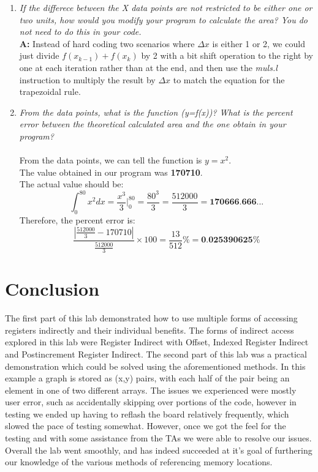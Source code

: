 \documentclass[letterpaper]{article}
\begin{document}
\begin{enumerate}
    \item \textit{If the differece between the X data points are not restricted to be either one
                  or two units, how would you modify your program to calculate the area? You do
                  not need to do this in your code.}\\
          \textbf{A: }
          Instead of hard coding two scenarios where $\Delta x$ is either 1 or 2,
          we could just divide $f(x_{k-1})+f(x_k)$ by 2 with a bit shift operation
          to the right by one at each iteration rather than at the end, and then use the \textit{muls.l} 
          instruction to multiply the result by $\Delta x$ to match the equation for the trapezoidal rule.
    \item \textit{From the data points, what is the function (y=f(x))? What is the percent error between the
                  theoretical calculated area and the one obtain in your program?}\\
          \\From the data points, we can tell the function is $y=x^2$.\\
          The value obtained in our program was \textbf{170710}.\\
          The actual value should be:\\
          $$\int_0^{80} x^2 dx = \frac{x^3}{3}\Big|_0^{80} = \frac{80^3}{3} = \frac{512000}{3}= \textbf{170666.666...} $$
          Therefore, the percent error is:
          $$\frac{|\frac{512000}{3}-170710|}{\frac{512000}{3}}\times 100 = \frac{13}{512}\% = \textbf{0.025390625\%}$$

  \end{enumerate}

\section{Conclusion}
The first part of this lab demonstrated how to use multiple forms of accessing 
registers indirectly and their individual benefits. The forms of indirect access 
explored in this lab were Register Indirect with Offset, Indexed Register 
Indirect and Postincrement Register Indirect. The second part of this lab was a
practical demonstration which could be solved using the aforementioned methods. 
In this example a graph is stored as (x,y) pairs, with each half of the pair 
being an element in one of two different arrays. The issues we experienced were 
mostly user error, such as accidentally skipping over portions of the code, 
however in testing we ended up having to reflash the board relatively frequently, 
which slowed the pace of testing somewhat. However, once we got the feel for the 
testing and with some assistance from the TAs we were able to resolve our issues. 
Overall the lab went smoothly, and has indeed succeeded at it's goal of furthering 
our knowledge of the various methods of referencing memory locations.  
\end{document}

